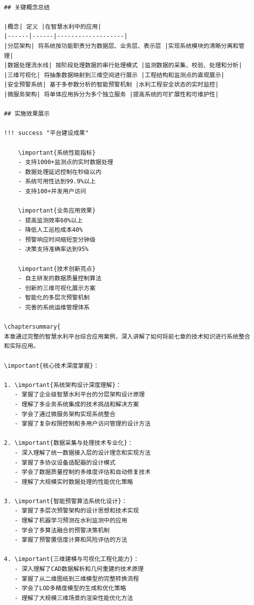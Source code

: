 \begin{verbatim}

## 关键概念总结

|概念| 定义 |在智慧水利中的应用|
|------|------|-------------------|
|分层架构| 将系统按功能职责分为数据层、业务层、表示层 |实现系统模块的清晰分离和管理|
|数据处理流水线| 按阶段处理数据的串行处理模式 |监测数据的采集、校验、处理和分析|
|三维可视化| 将抽象数据映射到三维空间进行展示 |工程结构和监测点的直观展示|
|安全预警系统| 基于多参数分析的智能预警机制 |水利工程安全状态的实时监控|
|微服务架构| 将单体应用拆分为多个独立服务 |提高系统的可扩展性和可维护性|

## 实施效果展示

!!! success "平台建设成果"
    
    \important{系统性能指标}
    - 支持1000+监测点的实时数据处理
    - 数据处理延迟控制在秒级以内
    - 系统可用性达到99.9%以上
    - 支持100+并发用户访问
    
    \important{业务应用效果}
    - 提高监测效率60%以上
    - 降低人工巡检成本40%
    - 预警响应时间缩短至分钟级
    - 决策支持准确率达到95%
    
    \important{技术创新亮点}
    - 自主研发的数据质量控制算法
    - 创新的三维可视化展示方案
    - 智能化的多层次预警机制
    - 完善的系统运维管理体系

\chaptersummary{
本章通过完整的智慧水利平台综合应用案例，深入讲解了如何将前七章的技术知识进行系统整合和实际应用。

\important{核心技术深度掌握}：

1. \important{系统架构设计深度理解}：
   - 掌握了企业级智慧水利平台的分层架构设计原理
   - 理解了多业务系统集成的技术挑战和解决方案
   - 学会了通过微服务架构实现系统整合
   - 掌握了复杂权限控制和多用户访问管理的设计方法

2. \important{数据采集与处理技术专业化}：
   - 深入理解了统一数据接入层的设计理念和实现方法
   - 掌握了多协议设备适配器的设计模式
   - 学会了数据质量控制的多维度评估和自动修复技术
   - 理解了大规模实时数据处理的性能优化策略

3. \important{智能预警算法系统化设计}：
   - 掌握了多层次预警架构的设计思想和技术实现
   - 理解了机器学习预测在水利监测中的应用
   - 学会了多算法融合的预警决策机制
   - 掌握了预警置信度计算和风险评估的方法

4. \important{三维建模与可视化工程化能力}：
   - 深入理解了CAD数据解析和几何重建的技术原理
   - 掌握了从二维图纸到三维模型的完整转换流程
   - 学会了LOD多精度模型的生成和优化策略
   - 理解了大规模三维场景的渲染性能优化方法


\end{verbatim}
